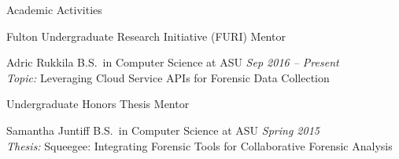 
\begin{rSection}{Academic Activities}

  \begin{rBulletSubsection}{Fulton Undergraduate Research Initiative (FURI) Mentor}

    \item Adric Rukkila \hfill B.S.\ in Computer Science at ASU \hfill \emph{Sep 2016 -- Present}\\
    \emph{Topic:} Leveraging Cloud Service APIs for Forensic Data Collection

  \end{rBulletSubsection}

  \begin{rBulletSubsection}{Undergraduate Honors Thesis Mentor}

    \item Samantha Juntiff \hfill B.S.\ in Computer Science at ASU \hfill \emph{Spring 2015}\\%
    \emph{Thesis:} Squeegee: Integrating Forensic Tools for Collaborative Forensic Analysis

  \end{rBulletSubsection}

\end{rSection}
